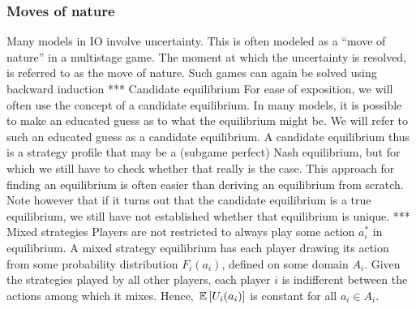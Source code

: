 \subsubsection{Moves of nature}
Many models in IO involve uncertainty. This is often modeled as a “move of nature” in a
multistage game. The moment at which the uncertainty is resolved, is referred to as the
move of nature. Such games can again be solved using backward induction
*** Candidate equilibrium
For ease of exposition, we will often use the concept of a candidate equilibrium. In many
models, it is possible to make an educated guess as to what the equilibrium might be. We
will refer to such an educated guess as a candidate equilibrium. A candidate equilibrium thus is a
strategy profile that may be a (subgame perfect) Nash equilibrium, but for
which we still have to check whether that really is the case. This approach for finding
an equilibrium is often easier than deriving an equilibrium from scratch. Note however
that if it turns out that the candidate equilibrium is a true equilibrium, we still have not
established whether that equilibrium is unique.
*** Mixed strategies
Players are not restricted to always play some action $a_i^*$ in equilibrium. A mixed strategy
equilibrium has each player drawing its action from some probability distribution $F_i(a_i)$,
defined on some domain $A_i$. Given the strategies played by all other players, each player $i$
is indifferent between the actions among which it mixes. Hence, $\,\mathbb{E}\left[U_i(a_i)\right]$ is constant
for all $a_i\in A_i$.
